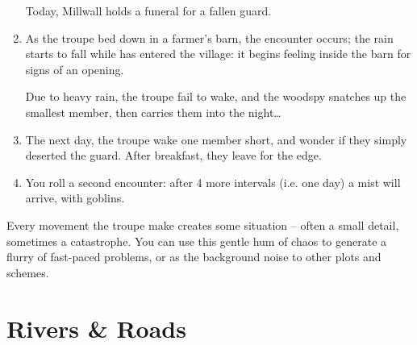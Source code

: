 \begin{multicols}{2}
\begin{enumerate}
  Today, Millwall holds a funeral for a fallen \gls{guard}.
  \item
  As the troupe bed down in a farmer's barn, the encounter occurs; the rain starts to fall while  has entered the \gls{village}: it begins feeling inside the barn for signs of an opening.

  Due to heavy rain, the troupe fail to wake, and the \gls{woodspy} snatches up the smallest member, then carries them into the night\ldots
  \item
  The next day, the troupe wake one member short, and wonder if they simply deserted the \gls{guard}.
  After breakfast, they leave for the \gls{edge}.
  \item
  You roll a second encounter: after 4 more \glspl{interval} (i.e. one day) a mist will arrive, with goblins.
\end{enumerate}

Every movement the troupe make creates some situation -- often a small detail, sometimes a catastrophe.
You can use this gentle hum of chaos to generate a flurry of fast-paced problems, or as the background noise to other plots and schemes.

\end{multicols}

\section{Rivers \& Roads}
\label{yourMap}

